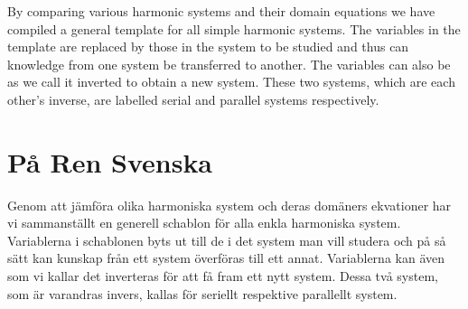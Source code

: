 \documentclass[]{elementary-physics}
\begin{document}
By comparing various harmonic systems and their domain equations we have compiled a general template for all simple harmonic systems.
The variables in the template are replaced by those in the system to be studied and thus can knowledge from one system be transferred to another.
The variables can also be as we call it inverted to obtain a new system.
These two systems, which are each other's inverse, are labelled serial and parallel systems respectively.

\section{På Ren Svenska}

Genom att jämföra olika harmoniska system och deras domäners ekvationer har vi sammanställt en generell schablon för alla enkla harmoniska system.
Variablerna i schablonen byts ut till de i det system man vill studera och på så sätt kan kunskap från ett system överföras till ett annat.
Variablerna kan även som vi kallar det inverteras för att få fram ett nytt system.
Dessa två system, som är varandras invers, kallas för seriellt respektive parallellt system.



\printbibliography
\end{document}
